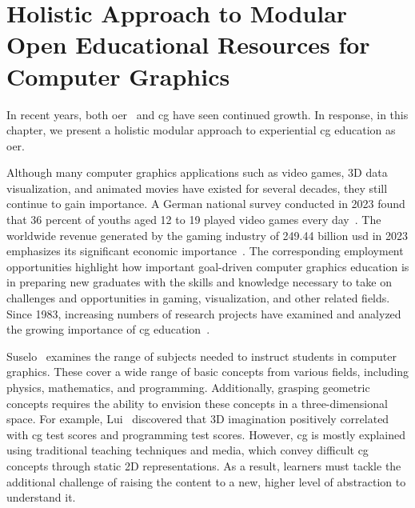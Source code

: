 \chapter[Holistic Approach to Modular Open Educational Resources for CG]{Holistic Approach to Modular Open Educational Resources for Computer Graphics\label{chap:ExGoer}} %
In recent years, both \acrfull{oer}~\cite{wiley:2014:oer} and \acrshort{cg} have seen continued growth.
In response, in this chapter, we present a holistic modular approach to experiential \acrshort{cg} education as \acrshort{oer}.

Although many computer graphics applications such as video games, 3D data visualization, and animated movies have existed for several decades, they still continue to gain importance. A German national survey conducted in 2023 found that 36 percent of youths aged 12 to 19 played video games every day~\cite{jim:2023:studies}. 
The worldwide revenue generated by the gaming industry of 249.44 billion \acrshort{usd} in 2023 emphasizes its significant economic importance~\cite{Statista-Market-Insights:2023:Videogames-worldwide}. The corresponding employment opportunities highlight how important goal-driven computer graphics education is in preparing new graduates with the skills and knowledge necessary to take on challenges and opportunities in gaming, visualization, and other related fields. Since 1983, increasing numbers of research projects have examined and analyzed the growing importance of \acrshort{cg} education~\cite{Balreira:2017:topics-cg-teaching}.

Suselo~\cite{Suselo:2019:problems-cg-teaching} examines the range of subjects needed to instruct students in computer graphics. These cover a wide range of basic concepts from various fields, including physics, mathematics, and programming. Additionally, grasping geometric concepts requires the ability to envision these concepts in a three-dimensional space. For example, Lui~\cite{Lui:2022:problems-cg-teaching} discovered that 3D imagination positively correlated with \acrshort{cg} test scores and programming test scores. However, \acrshort{cg} is mostly explained using traditional teaching techniques and media, which convey difficult \acrshort{cg} concepts through static 2D representations. As a result, learners must tackle the additional challenge of raising the content to a new, higher level of abstraction to understand it.


